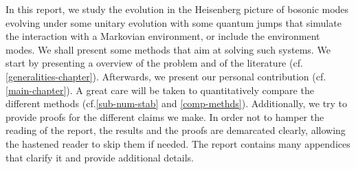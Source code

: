 In this report, we study the evolution in the Heisenberg picture of bosonic modes evolving under some unitary evolution with some quantum jumps that simulate the interaction with a Markovian environment, or include the environment modes. We shall present some methods that aim at solving such systems. We start by presenting a overview of the problem and of the literature (cf.\@ \autoref{generalities-chapter}). Afterwards, we present our personal contribution (cf.\@ \autoref{main-chapter}). A great care will be taken to quantitatively compare the different methods (cf.\@ \autoref{sub-num-stab} and \autoref{comp-methds}). Additionally, we try to provide proofs for the different claims we make. In order not to hamper the reading of the report, the results and the proofs are demarcated clearly, allowing the hastened reader to skip them if needed. The report contains many appendices that clarify it and provide additional details. 